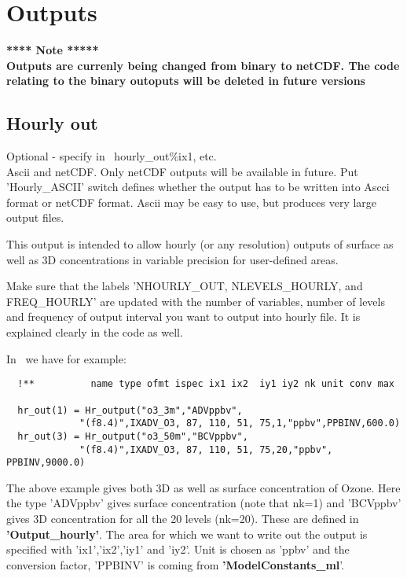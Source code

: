 \chapter{Outputs}
\label{OUTPUTS}

{\bf ***** Note *****\\
Outputs are currenly being changed from binary to netCDF.
The code relating to the binary outoputs will be deleted in future versions}




\section{Hourly out}

\noindent
Optional -  specify in \MyOutputs\, hourly\_out\%ix1, etc.\\
Ascii and netCDF.  Only netCDF outputs will be available in future. 
Put 'Hourly\_ASCII' switch defines whether the output has to be written
into Ascci format or netCDF format.  Ascii may be easy to use, but
produces very large output files.  

\vspace{1cm}

This output is intended to allow hourly (or any resolution) outputs of surface
as well as 3D concentrations in
variable precision for user-defined areas.  

Make sure that the labels 'NHOURLY\_OUT, NLEVELS\_HOURLY, and FREQ\_HOURLY' are updated with the number of
variables, number of levels and frequency of output interval you want
to output into hourly file.  It is explained clearly in the code as
well.  

 
In \MyOutputs\ we have for example:

\begin{small}\begin{verbatim}
  !**          name type ofmt ispec ix1 ix2  iy1 iy2 nk unit conv max

  hr_out(1) = Hr_output("o3_3m","ADVppbv", 
             "(f8.4)",IXADV_O3, 87, 110, 51, 75,1,"ppbv",PPBINV,600.0)
  hr_out(3) = Hr_output("o3_50m","BCVppbv",
             "(f8.4)",IXADV_O3, 87, 110, 51, 75,20,"ppbv", PPBINV,9000.0)
\end{verbatim}
\end{small}

The above example gives both 3D as well as surface concentration of
Ozone.  Here the type 'ADVppbv' gives surface concentration (note
that nk=1) and 'BCVppbv' gives 3D concentration for all the 20 levels
(nk=20). These are defined in {\bf 'Output\_hourly'}.  The area for which we want to write out the output is
specified with 'ix1','ix2','iy1' and 'iy2'.  Unit is chosen as 'ppbv'
and the conversion factor, 'PPBINV' is coming from
{\bf 'ModelConstants\_ml}'.  


